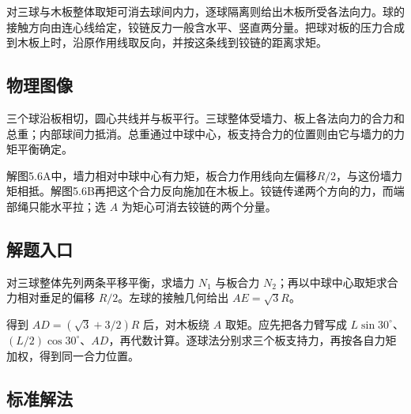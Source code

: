 \documentclass[UTF8,fontset=fandol,a4paper,11pt]{ctexart}
\begin{document}
对三球与木板整体取矩可消去球间内力，逐球隔离则给出木板所受各法向力。球的接触方向由连心线给定，铰链反力一般含水平、竖直两分量。把球对板的压力合成到木板上时，沿原作用线取反向，并按这条线到铰链的距离求矩。




\subsection*{物理图像}

三个球沿板相切，圆心共线并与板平行。三球整体受墙力、板上各法向力的合力和总重；内部球间力抵消。总重通过中球中心，板支持合力的位置则由它与墙力的力矩平衡确定。

解图5.6A中，墙力相对中球中心有力矩，板合力作用线向左偏移$R/2$，与这份墙力矩相抵。解图5.6B再把这个合力反向施加在木板上。铰链传递两个方向的力，而端部绳只能水平拉；选 $A$ 为矩心可消去铰链的两个分量。



\subsection*{解题入口}

对三球整体先列两条平移平衡，求墙力 $N_1$ 与板合力 $N_2$；再以中球中心取矩求合力相对垂足的偏移 $R/2$。左球的接触几何给出 $AE=\sqrt3R$。

得到 $AD=(\sqrt3+3/2)R$ 后，对木板绕 $A$ 取矩。应先把各力臂写成 $L\sin30^\circ$、$(L/2)\cos30^\circ$、$AD$，再代数计算。逐球法分别求三个板支持力，再按各自力矩加权，得到同一合力位置。



\subsection*{标准解法}
\end{document}
